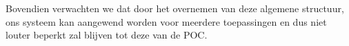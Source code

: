 \documentclass{hogent-article}
\begin{document}
    Bovendien verwachten we dat door het overnemen van deze algemene structuur, ons systeem kan aangewend worden voor meerdere toepassingen en dus niet louter beperkt zal blijven tot deze van de POC.
    
    
    \printbibliography[heading=bibintoc]
    
\end{document}
